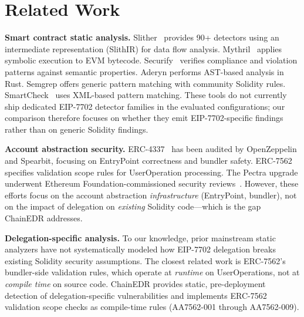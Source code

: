 \section{Related Work}
\label{sec:related_work}

\textbf{Smart contract static analysis.} Slither~\cite{slither} provides 90+ detectors using an intermediate representation (SlithIR) for data flow analysis. Mythril~\cite{mythril} applies symbolic execution to EVM bytecode. Securify~\cite{securify} verifies compliance and violation patterns against semantic properties. Aderyn performs AST-based analysis in Rust. Semgrep offers generic pattern matching with community Solidity rules. SmartCheck~\cite{smartcheck} uses XML-based pattern matching. These tools do not currently ship dedicated EIP-7702 detector families in the evaluated configurations; our comparison therefore focuses on whether they emit EIP-7702-specific findings rather than on generic Solidity findings.

\textbf{Account abstraction security.} ERC-4337~\cite{erc4337} has been audited by OpenZeppelin and Spearbit, focusing on EntryPoint correctness and bundler safety. ERC-7562~\cite{erc7562} specifies validation scope rules for UserOperation processing. The Pectra upgrade underwent Ethereum Foundation-commissioned security reviews~\cite{pectra_audit}. However, these efforts focus on the account abstraction \textit{infrastructure} (EntryPoint, bundler), not on the impact of delegation on \textit{existing} Solidity code---which is the gap ChainEDR addresses.

\textbf{Delegation-specific analysis.} To our knowledge, prior mainstream static analyzers have not systematically modeled how EIP-7702 delegation breaks existing Solidity security assumptions. The closest related work is ERC-7562's bundler-side validation rules, which operate at \textit{runtime} on UserOperations, not at \textit{compile time} on source code. ChainEDR provides static, pre-deployment detection of delegation-specific vulnerabilities and implements ERC-7562 validation scope checks as compile-time rules (AA7562-001 through AA7562-009).
